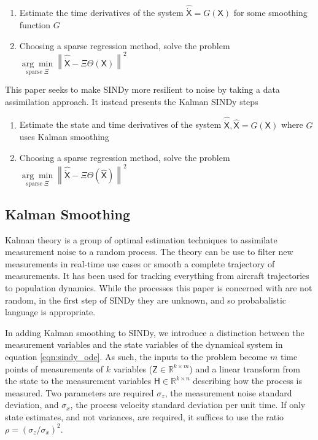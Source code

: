 \documentclass{article}
\newcommand{\mat}[1]{\boldsymbol{\mathsf{#1}}}
\newcommand{\R}[1]{\mathbb{R}^{#1}}
\begin{document}
\begin{enumerate}
    \item Estimate the time derivatives of the system ${\mat{\widehat{\dot X}}} = G(\mat X)$ for some smoothing function $G$
    \item Choosing a sparse regression method, solve the problem $\underset{\text{sparse } \mat \Xi}{\arg\min} \left\| \mat{\widehat{\dot{X}}} - \mat \Xi \mat \Theta(\mat X) \right\|^2$
\end{enumerate}
This paper seeks to make SINDy more resilient to noise by taking a data assimilation approach.  It instead presents the Kalman SINDy steps
\begin{enumerate}
    \item Estimate the state and time derivatives of the system ${\mat{\widehat{\dot X}}}, \mat{\widehat X} = G(\mat X)$ where $G$ uses Kalman smoothing
    \item Choosing a sparse regression method, solve the problem $\underset{\text{sparse } \mat \Xi}{\arg\min} \left\| \mat{\widehat{\dot{X}}} - \mat \Xi \mat \Theta(\mat {\widehat X}) \right\|^2$
\end{enumerate}

\subsection{Kalman Smoothing}

Kalman theory is a group of optimal estimation techniques to assimilate measurement noise to a random process.  The theory can be use to filter new measurements in real-time use cases or smooth a complete trajectory of measurements.  It has been used for tracking everything from aircraft trajectories to population dynamics.  While the processes this paper is concerned with are not random, 
in the first step of SINDy they are unknown, and so probabalistic language is appropriate.


In adding Kalman smoothing to SINDy, we introduce a distinction between the measurement variables and the state variables of the dynamical system in equation 
\ref{eqn:sindy_ode}.  As such, the inputs to the problem become $m$ time points of measurements of $k$ variables ($\mat Z\in \R{k\times m}$) and a linear transform from the state to the measurement variables $\mat H \in \R{k \times n}$ describing how the process is measured.  Two parameters are required $\sigma_z$, the measurement noise standard deviation, and $\sigma_x$, the process velocity standard deviation per unit time.  If only state estimates, and not variances, are required, it suffices to use the ratio $\rho = (\sigma_z / \sigma_x)^2$.
\end{document}
